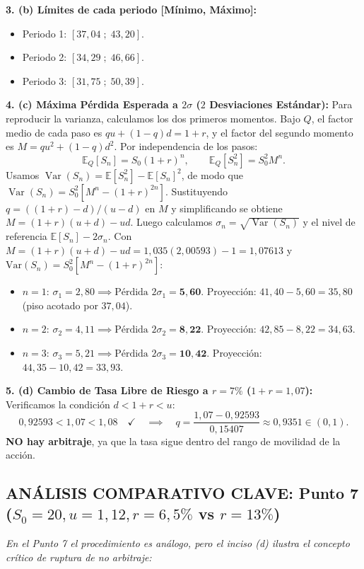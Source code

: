 \documentclass[11pt, a4paper]{article}
\begin{document}
\textbf{3. (b) Límites de cada periodo [Mínimo, Máximo]:}
\begin{itemize}
    \item Periodo 1: $[37{,}04 \;;\; 43{,}20]$.
    \item Periodo 2: $[34{,}29 \;;\; 46{,}66]$.
    \item Periodo 3: $[31{,}75 \;;\; 50{,}39]$.
\end{itemize}

\textbf{4. (c) Máxima Pérdida Esperada a $2\sigma$ ($2$ Desviaciones Estándar):}
Para reproducir la varianza, calculamos los dos primeros momentos. Bajo \(Q\), el factor medio de cada paso es \(qu+(1-q)d=1+r\), y el factor del segundo momento es \(M=qu^2+(1-q)d^2\). Por independencia de los pasos:
\[\mathbb{E}_{Q}[S_n]=S_0(1+r)^n,\qquad \mathbb{E}_{Q}[S_n^2]=S_0^2M^n.\]
Usamos \(\operatorname{Var}(S_n)=\mathbb{E}[S_n^2]-\mathbb{E}[S_n]^2\), de modo que \(\operatorname{Var}(S_n)=S_0^2[M^n-(1+r)^{2n}]\). Sustituyendo \(q=((1+r)-d)/(u-d)\) en \(M\) y simplificando se obtiene \(M=(1+r)(u+d)-ud\). Luego calculamos \(\sigma_n=\sqrt{\operatorname{Var}(S_n)}\) y el nivel de referencia \(\mathbb{E}[S_n]-2\sigma_n\).
Con $M = (1+r)(u+d) - ud = 1{,}035(2{,}00593) - 1 = 1{,}07613$ y $\text{Var}(S_n) = S_0^2 [M^n - (1+r)^{2n}]$:
\begin{itemize}
    \item $n=1$: $\sigma_1 = 2{,}80 \implies \text{Pérdida } 2\sigma_1 = \mathbf{5{,}60}$. Proyección: $41{,}40 - 5{,}60 = 35{,}80$ (piso acotado por $37{,}04$).
    \item $n=2$: $\sigma_2 = 4{,}11 \implies \text{Pérdida } 2\sigma_2 = \mathbf{8{,}22}$. Proyección: $42{,}85 - 8{,}22 = 34{,}63$.
    \item $n=3$: $\sigma_3 = 5{,}21 \implies \text{Pérdida } 2\sigma_3 = \mathbf{10{,}42}$. Proyección: $44{,}35 - 10{,}42 = 33{,}93$.
\end{itemize}

\textbf{5. (d) Cambio de Tasa Libre de Riesgo a $r=7\%$ ($1+r=1{,}07$):}
Verificamos la condición $d < 1+r < u$:
\[
0{,}92593 < 1{,}07 < 1{,}08 \quad \checkmark \quad \implies \quad q = \frac{1{,}07 - 0{,}92593}{0{,}15407} \approx 0{,}9351 \in (0,1).
\]
\textbf{NO hay arbitraje}, ya que la tasa sigue dentro del rango de movilidad de la acción.

\subsection*{ANÁLISIS COMPARATIVO CLAVE: Punto 7 ($S_0=20, u=1{,}12, r=6{,}5\%$ vs $r=13\%$)}
\textit{En el Punto 7 el procedimiento es análogo, pero el inciso (d) ilustra el concepto crítico de ruptura de no arbitraje:}
\end{document}
